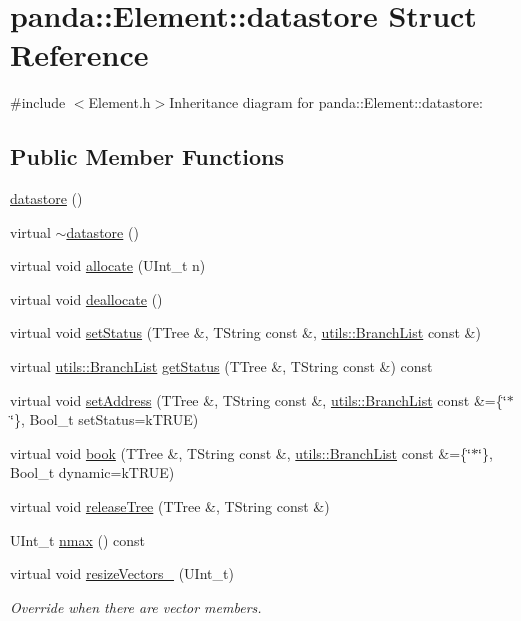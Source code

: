 \hypertarget{structpanda_1_1Element_1_1datastore}{
\section{panda::Element::datastore Struct Reference}
\label{structpanda_1_1Element_1_1datastore}
}


{\ttfamily \#include $<$Element.h$>$}Inheritance diagram for panda::Element::datastore:\subsection*{Public Member Functions}
\begin{DoxyCompactItemize}
\item 
\hyperlink{structpanda_1_1Element_1_1datastore_a19506caec8d63f38674506dbb8283495}{datastore} ()
\item 
virtual \hyperlink{structpanda_1_1Element_1_1datastore_a14bdbf5fcb0c5553c70d43de0cffd090}{$\sim$datastore} ()
\item 
virtual void \hyperlink{structpanda_1_1Element_1_1datastore_a0397350c92ee5cbf2d16cf66fc701afa}{allocate} (UInt\_\-t n)
\item 
virtual void \hyperlink{structpanda_1_1Element_1_1datastore_aa9b2ee3eacdde38bd77108485678ac86}{deallocate} ()
\item 
virtual void \hyperlink{structpanda_1_1Element_1_1datastore_a8e57a201b92f26a481f2d549e39273e9}{setStatus} (TTree \&, TString const \&, \hyperlink{classpanda_1_1utils_1_1BranchList}{utils::BranchList} const \&)
\item 
virtual \hyperlink{classpanda_1_1utils_1_1BranchList}{utils::BranchList} \hyperlink{structpanda_1_1Element_1_1datastore_a9f9eb1f7611bc73f10a010a149d17a15}{getStatus} (TTree \&, TString const \&) const 
\item 
virtual void \hyperlink{structpanda_1_1Element_1_1datastore_a1b81da47e4af670a88db7d1d7fbd0875}{setAddress} (TTree \&, TString const \&, \hyperlink{classpanda_1_1utils_1_1BranchList}{utils::BranchList} const \&=\{\char`\"{}$\ast$\char`\"{}\}, Bool\_\-t setStatus=kTRUE)
\item 
virtual void \hyperlink{structpanda_1_1Element_1_1datastore_a2e677f904aee6a53452674b83bea49e4}{book} (TTree \&, TString const \&, \hyperlink{classpanda_1_1utils_1_1BranchList}{utils::BranchList} const \&=\{\char`\"{}$\ast$\char`\"{}\}, Bool\_\-t dynamic=kTRUE)
\item 
virtual void \hyperlink{structpanda_1_1Element_1_1datastore_a7acb1440122c336e94738695ca5a11bd}{releaseTree} (TTree \&, TString const \&)
\item 
UInt\_\-t \hyperlink{structpanda_1_1Element_1_1datastore_a4791c638f40a6177f52d8d5eb847da32}{nmax} () const 
\item 
virtual void \hyperlink{structpanda_1_1Element_1_1datastore_a4696a188a70355c43a5482f895433230}{resizeVectors\_\-} (UInt\_\-t)
\begin{DoxyCompactList}\small\item\em Override when there are vector members. \item\end{DoxyCompactList}\end{DoxyCompactItemize}
